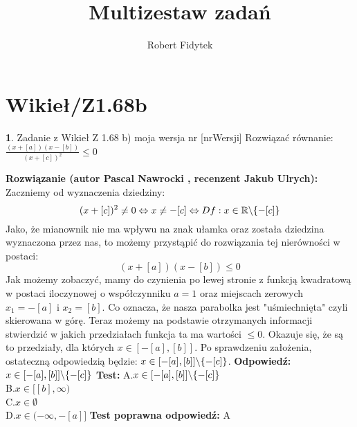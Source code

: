 \documentclass[12pt, a4paper]{article}
\title{Multizestaw zadań}
\author{Robert Fidytek}
\date{}
\theoremstyle{definition} %
\newtheorem{zad}{}
\newcommand{\kategoria}[1]{\section{#1}} %
\newcommand{\zadStart}[1]{\begin{zad}#1\newline} %
\newcommand{\zadStop}{\end{zad}}   %
\newcommand{\rozwStart}[2]{\noindent \textbf{Rozwiązanie (autor #1 , recenzent #2): }\newline} %
\newcommand{\odpStart}{\noindent \textbf{Odpowiedź:}\newline}    %
\newcommand{\odpStop}{\newline}                                             %
\newcommand{\testStart}{\noindent \textbf{Test:}\newline} %
\newcommand{\testStop}{\newline} %
\newcommand{\kluczStart}{\noindent \textbf{Test poprawna odpowiedź:}\newline} %
\newcommand{\kluczStop}{\newline} %
\begin{document}
\maketitle


\kategoria{Wikieł/Z1.68b}
\zadStart{Zadanie z Wikieł Z 1.68 b) moja wersja nr [nrWersji]}
Rozwiązać równanie: $\frac{(x+[a])(x-[b])}{(x+[c])^2}\leq0$
\zadStop
\rozwStart{Pascal Nawrocki}{Jakub Ulrych}
Zaczniemy od wyznaczenia dziedziny:
$$(x+[c])^2\neq0\Leftrightarrow x\neq-[c] \Leftrightarrow Df:x\in\mathbb{R}\symbol{92}\{-[c]\}$$
Jako, że mianownik nie ma wpływu na znak ułamka oraz została dziedzina wyznaczona przez nas, to możemy przystąpić do rozwiązania tej nierówności w postaci:
$$(x+[a])(x-[b])\leq0$$
Jak możemy zobaczyć, mamy do czynienia po lewej stronie z funkcją kwadratową w postaci iloczynowej o współczynniku $a=1$ oraz miejscach zerowych $x_1=-[a]$ i $x_2=[b]$. 
Co oznacza, że nasza parabolka jest "uśmiechnięta" czyli skierowana w górę. Teraz możemy na podstawie otrzymanych informacji stwierdzić w jakich przedziałach funkcja ta ma wartości $\leq0$. Okazuje się, że są to przedziały, dla których $x\in[-[a],[b]]$. Po sprawdzeniu założenia, ostateczną odpowiedzią będzie:  $x\in[-[a],[b]]\symbol{92}\{-[c]\}$.
\odpStart
$x\in[-[a],[b]]\symbol{92}\{-[c]\}$
\odpStop
\testStart
A.$x\in[-[a],[b]]\symbol{92}\{-[c]\}$
\\
B.$x\in[[b],\infty)$
\\
C.$x\in\emptyset$
\\
D.$x\in(-\infty,-[a]]$
\testStop
\kluczStart
A
\kluczStop
\end{document}

